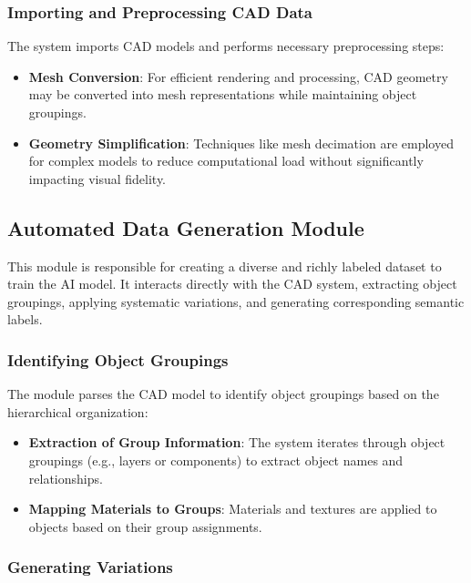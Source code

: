 \documentclass{article}
\begin{document}
\subsubsection{Importing and Preprocessing CAD Data}

The system imports CAD models and performs necessary preprocessing steps:

\begin{itemize}
    \item \textbf{Mesh Conversion}: For efficient rendering and processing, CAD geometry may be converted into mesh representations while maintaining object groupings.
    \item \textbf{Geometry Simplification}: Techniques like mesh decimation are employed for complex models to reduce computational load without significantly impacting visual fidelity.
\end{itemize}

\subsection{Automated Data Generation Module}

This module is responsible for creating a diverse and richly labeled dataset to train the AI model. It interacts directly with the CAD system, extracting object groupings, applying systematic variations, and generating corresponding semantic labels.

\subsubsection{Identifying Object Groupings}

The module parses the CAD model to identify object groupings based on the hierarchical organization:

\begin{itemize}
    \item \textbf{Extraction of Group Information}: The system iterates through object groupings (e.g., layers or components) to extract object names and relationships.
    \item \textbf{Mapping Materials to Groups}: Materials and textures are applied to objects based on their group assignments.
\end{itemize}

\subsubsection{Generating Variations}
\end{document}
